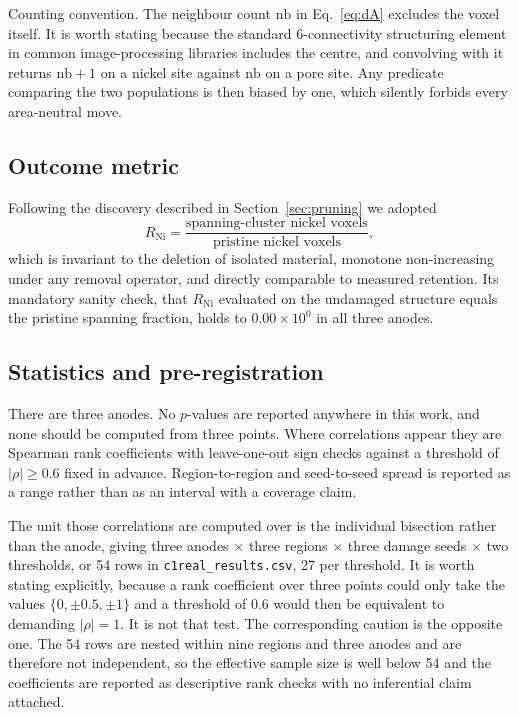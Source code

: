 \documentclass[5p,times,twocolumn]{elsarticle}
\newcommand{\Rni}{R_{\mathrm{Ni}}}
\newcommand{\nb}{\mathrm{nb}}
\begin{document}
Counting convention. The neighbour count $\nb$ in Eq.~\eqref{eq:dA} excludes
the voxel itself. It is worth stating because the standard 6-connectivity structuring element in
common image-processing libraries includes the centre,
and convolving with it returns $\nb+1$ on a nickel site against $\nb$ on a pore
site. Any predicate comparing the two populations is then biased by one, which
silently forbids every area-neutral move.

\subsection{Outcome metric}
\label{sec:metric}

Following the discovery described in Section~\ref{sec:pruning} we adopted
\begin{equation}
  \Rni = \frac{\text{spanning-cluster nickel voxels}}
              {\text{pristine nickel voxels}} ,
\end{equation}
which is invariant to the deletion of isolated material, monotone
non-increasing under any removal operator, and directly comparable to measured
retention. Its mandatory sanity check, that $\Rni$ evaluated on the undamaged
structure equals the pristine spanning fraction, holds to
$0.00\times10^{0}$ in all three anodes.

\subsection{Statistics and pre-registration}

There are three anodes. No $p$-values are reported anywhere in this work, and
none should be computed from three points. Where correlations appear they are
Spearman rank coefficients with leave-one-out sign checks against a threshold
of $|\rho|\geq0.6$ fixed in advance. Region-to-region and seed-to-seed spread
is reported as a range rather than as an interval with a coverage claim.

The unit those correlations are computed over is the individual bisection
rather than the anode, giving three anodes $\times$ three regions $\times$ three
damage seeds $\times$ two thresholds, or 54 rows in
\texttt{c1real\_results.csv}, 27 per threshold. It is worth stating explicitly, because a rank coefficient over three points
could only take the values $\{0,\pm0.5,\pm1\}$ and a threshold of $0.6$ would then be equivalent to
demanding $|\rho| = 1$. It is not that test. The corresponding caution is the
opposite one. The 54 rows are nested within nine regions and three anodes and
are therefore not independent, so the effective sample size is well below 54
and the coefficients are reported as descriptive rank checks with no inferential
claim attached.
\end{document}
